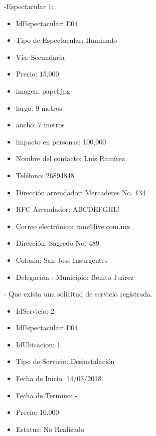    -Espectacular 1:
    \begin{itemize}
        \item IdEspectacular: E04
        \item Tipo de Espectacular: Iluminado
        \item Vía: Secundaria
        \item Precio: 15,000
        \item imagen: papel.jpg
        \item largo: 9 metros
        \item ancho: 7 metros
        \item impacto en personas: 100,000
        \item Nombre del contacto: Luis Ramírez
        \item Teléfono: 26894848
        \item Dirección arrendador: Mercaderes No. 134
        \item RFC Arrendador: ABCDEFGHIJ
        \item Correo electrónico: ram@live.com.mx
        \item Dirección: Sagredo No. 489
        \item Colonia: San José Insurgentes
        \item Delegación - Municipio: Benito Juárez
    \end{itemize}  
    - Que exista una solicitud de servicio registrada.
    \begin{itemize}
        \item IdServicio: 2
        \item IdEspectacular: E04
        \item IdUbicacion: 1
        \item Tipo de Servicio: Desinstalación
        \item Fecha de Inicio: 14/03/2018
        \item Fecha de Termino: -
        \item Precio: 10,000
        \item Estatus: No Realizado
    \end{itemize}

